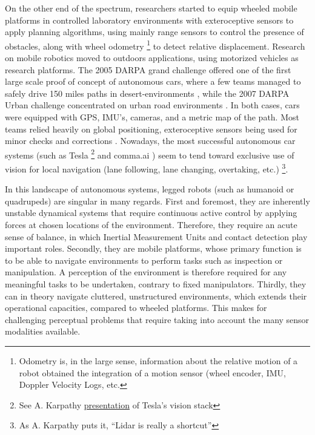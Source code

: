 On the other end of the spectrum, researchers started to equip wheeled mobile platforms in controlled laboratory environments with exteroceptive sensors 
\cite{Nilsson1984ShakeyTR, chatila1985position} to apply planning algorithms, using mainly range sensors to control the presence of obstacles, along with wheel odometry \footnote{Odometry is, in the large sense, information about the relative motion of a robot obtained the integration of a motion sensor (wheel encoder, IMU, Doppler Velocity Logs, etc.}
to detect relative displacement. 
Research on mobile robotics moved to outdoors applications, using motorized vehicles as research platforms. The 2005 DARPA grand challenge
offered one of the first large scale proof of concept of autonomous cars, where a few teams managed to safely drive 150 miles paths in desert-environments 
\cite{thrun2006stanley}, while the 2007 DARPA Urban challenge concentrated on urban road environments \cite{urmson2008autonomous}. In both cases, cars were 
equipped with GPS, IMU's, cameras, and a metric map of the path. Most teams relied heavily on global positioning, exteroceptive sensors being used for 
minor checks and corrections \cite{hillel2014recent}. Nowadays, the most successful autonomous car systems (such as Tesla \footnote{See A. Karpathy  
\href{https://www.youtube.com/watch?v=g6bOwQdCJrc}{presentation} of Tesla's vision stack} and comma.ai \cite{comma2020openpilot}) 
seem to tend toward exclusive use of vision for local navigation (lane following, lane changing, overtaking, etc.) \footnote{As A. Karpathy puts it, “Lidar is really a shortcut”}. 


In this landscape of autonomous systems, legged robots (such as humanoid 
or quadrupeds) are singular in many regards. 
First and foremost, they are inherently unstable dynamical systems that require continuous active control by applying forces at chosen locations of the environment. 
Therefore, they require an acute sense of balance, in which Inertial Measurement Units and contact detection play important roles. 
Secondly, they are mobile platforms, whose primary function is to be able to navigate environments to perform tasks such as inspection or manipulation.
A perception of the environment is therefore required for any meaningful tasks to be undertaken, contrary to fixed manipulators.
Thirdly, they can in theory navigate cluttered, unstructured environments, which extends their operational capacities, compared to wheeled platforms.
This makes for challenging perceptual problems that require taking into account the many sensor modalities available.

